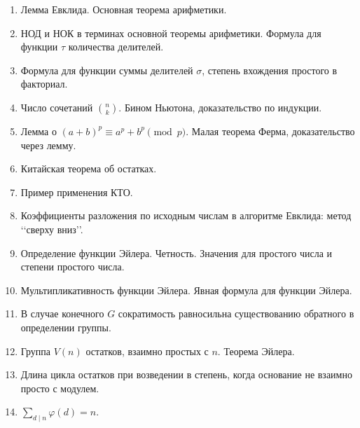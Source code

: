 \documentclass[11pt]{article}
\begin{document}
\begin{enumerate}
    \item Лемма Евклида. Основная теорема арифметики.
    \item НОД и НОК в терминах основной теоремы арифметики. Формула для функции $\tau$ количества делителей.
    \item Формула для функции суммы делителей $\sigma$, степень вхождения простого в факториал.
    \item Число сочетаний $\binom{n}{k}$. Бином Ньютона, доказательство по индукции.
    \item Лемма о $(a + b)^{p} \equiv a^p + b^p \pmod{p}$. Малая теорема Ферма, доказательство через лемму.
    \item Китайская теорема об остатках.
    \item Пример применения КТО.
    \item Коэффициенты разложения по исходным числам в алгоритме Евклида: метод \lq\lq сверху вниз\rq\rq.
    \item Определение функции Эйлера. Четность. Значения для простого числа и степени простого числа.
    \item Мультипликативность функции Эйлера. Явная формула для функции Эйлера.
    \item В случае конечного \(G\) сократимость равносильна существованию обратного в определении группы.
    \item Группа \(V(n)\) остатков, взаимно простых с \(n\). Теорема Эйлера.
    \item Длина цикла остатков при возведении в степень, когда основание не взаимно просто с модулем.
    \item \(\sum_{d \mid n} \varphi(d) = n\).
\end{enumerate}
\pagestyle{empty}
\end{document}

